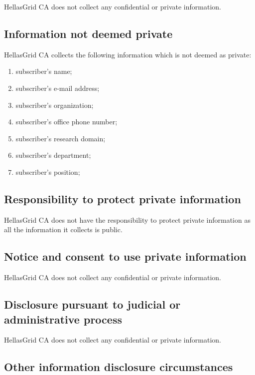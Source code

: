 HellasGrid CA does not collect any confidential or private information.

\subsection{Information not deemed private}

HellasGrid CA collects the following information which is not deemed as private:

\begin{enumerate}
\item{subscriber's name;}
\item{subscriber's e-mail address;}
\item{subscriber's organization;}
\item{subscriber's office phone number;}
\item{subscriber's research domain;}
\item{subscriber's department;}
\item{subscriber's position;}
\end{enumerate}

\subsection{Responsibility to protect private information}

HellasGrid CA does not have the responsibility to protect private information as all the information it collects is public.

\subsection{Notice and consent to use private information}

HellasGrid CA does not collect any confidential or private information.

\subsection{Disclosure pursuant to judicial or administrative process}

HellasGrid CA does not collect any confidential or private information.

\subsection{Other information disclosure circumstances}

